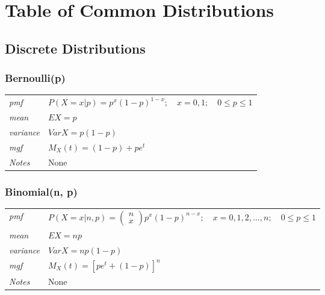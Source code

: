 \documentclass[12pt]{article}
\begin{document}
\newpage
\section*{Table of Common Distributions}
\subsection*{Discrete Distributions}
\subsubsection*{Bernoulli(p) \cite[p. 621]{StatisticalInference}}
\begin{tabularx}{\textwidth}{ l X }
\emph{pmf} & $P(X=x|p)=p^x(1-p)^{1-x}; \quad x=0, 1; \quad 0 \leq p \leq 1$ \\
\emph{mean} & $EX=p$ \\
\emph{variance} & $Var X =p(1-p)$ \\
\emph{mgf} & $M_X(t)=(1-p)+pe^t$ \\
\emph{Notes} & None\\
\end{tabularx}

\subsubsection*{Binomial(n, p) \cite[p. 621]{StatisticalInference}}
\begin{tabularx}{\textwidth}{ l X }
\emph{pmf} & $P(X=x|n, p)=\begin{pmatrix}
n \\
x
\end{pmatrix}p^x(1-p)^{n-x}; \quad x=0, 1, 2, \dots, n; \quad 0 \leq p \leq 1$ \\
\emph{mean} & $EX=np$ \\
\emph{variance} & $Var X =np(1-p)$ \\
\emph{mgf} & $M_X(t)=[pe^t + (1-p)]^n$ \\
\emph{Notes} & None\\
\end{tabularx}
\end{document}
